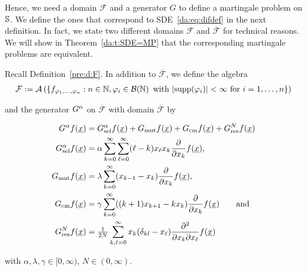 \noindent
Hence, we need a domain $\mathcal{F}$ and a generator $G$ to define a martingale problem
on $\mathbb{S}$. We define the ones that correspond to SDE~\eqref{da:eq:difdef} in the next
definition. In fact, we state two different domains $\mathcal{F}$ and $\overline{\mathcal{F}}$ for
technical reasons. We will show in Theorem~\ref{da:t:SDE=MP} that the
corresponding martingale problems are equivalent.

\begin{Definition}\mbox{}\label{da:d:D&G-MP}
Recall Definition~\ref{pre:d:F}. In addition to $\overline{\mathcal F}$, we
define the algebra
\begin{align*}
\mathcal{F} &:=  \mathcal{A} \left( \{f_{\varphi_1,...,\varphi_n}: n\in\mathbb N, \varphi_i \in
        	\mathcal{B}\!\left(\mathbb{N}\right) \text{ with } |\text{supp}(\varphi_i)| < \infty \text{ for } i = 1,\ldots,n\}
        	\right) \\
\end{align*}

\noindent
and the generator $G^{\alpha}$ on $\overline{\mathcal F}$ with domain $\overline{\mathcal F}$
by

{\allowdisplaybreaks
\begin{equation*} \label{da:eq:GA}
\begin{aligned}
\GAFX{f}{\Vector{x}} & =
		\GAselFX{f}{\Vector{x}} + \GAmutFX{f}{\Vector{x}} 
	    + \GAcompFX{f}{\Vector{x}} + \GNresFX{f}{\Vector{x}} \\
\GAselFX{f}{\Vector{x}} & =
        \alpha \sum_{k=0}^\infty \sum_{\ell=0}^\infty(\ell-k)x_\ell x_k
        \frac{\partial}{\partial x_k} f(\Vector{x}),\\ 
\GAmutFX{f}{\Vector{x}} & = 
		\lambda \sum_{k=0}^\infty (x_{k-1} - x_k) \frac{\partial}{\partial x_k} f(\Vector{x}),\\
\GAcompFX{f}{\Vector{x}} & = 
		\gamma \sum_{k=0}^\infty ((k+1)x_{k+1} - kx_k) \frac{\partial}{\partial x_k}
		f(\Vector{x}) \qquad \text{and}\\ 
\GNresFX{f}{\Vector{x}} &= 
		\tfrac 1{2N} \sum_{k,\ell = 0}^\infty x_k ( \delta_{kl} - x_\ell) \frac{\partial^2}{\partial x_k
		\partial x_\ell} f(\Vector{x})
      \end{aligned}
\end{equation*}}

\noindent
with $\alpha, \lambda, \gamma\in [0,\infty)$, $N\in(0,\infty)$.
\end{Definition}


